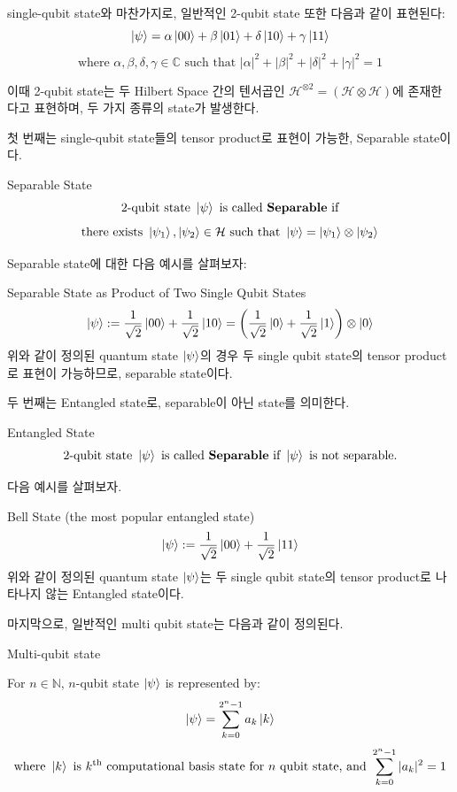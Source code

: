\noindent single-qubit state와 마찬가지로, 일반적인 2-qubit state 또한 다음과 같이 표현된다:
\[
    \ket{\psi} = \alpha \ket{00} + \beta \ket{01} + \delta \ket{10} + \gamma \ket{11}
\]
\[
    \text{where } \alpha, \beta, \delta, \gamma \in \mathbb{C} \text{ such that } |\alpha|^2 + |\beta|^2 + |\delta|^2 + |\gamma|^2 = 1
\]

\noindent 이때 2-qubit state는 두 Hilbert Space 간의 텐서곱인 \(\mathcal{H}^{\otimes 2} = (\mathcal{H} \otimes \mathcal{H})\)에 존재한다고 표현하며, 두 가지 종류의 state가 발생한다.

\noindent 첫 번째는 single-qubit state들의 tensor product로 표현이 가능한, Separable state이다.
\begin{definition}
    Separable State
    \[
        \text{2-qubit state }\ket{\psi} \text{ is called \textbf{Separable} if}
    \]
    \[
        \text{there exists } \ket{\psi_1}, \ket{\psi_2} \in \mathcal{H} \text{ such that } \ket{\psi} = \ket{\psi_1} \otimes \ket{\psi_2}
    \]

\end{definition}
Separable state에 대한 다음 예시를 살펴보자:
\begin{example}
    Separable State as Product of Two Single Qubit States
\[
    \ket \psi := {1 \over \sqrt{2}}\ket{00} + {1 \over \sqrt{2}}\ket{10} = \left({1 \over \sqrt{2}}\ket{0} + {1 \over \sqrt{2}}\ket{1}\right) \otimes \ket{0}
\]
위와 같이 정의된 quantum state \(\ket \psi\)의 경우 두 single qubit state의 tensor product로 표현이 가능하므로, separable state이다.
\end{example}

\noindent 두 번째는 Entangled state로, separable이 아닌 state를 의미한다.
\begin{definition}
    Entangled State
    \[
        \text{2-qubit state }\ket{\psi} \text{ is called \textbf{Separable} if } \ket\psi \text{ is not separable.}
    \]
\end{definition}

다음 예시를 살펴보자.
\begin{example}
    Bell State (the most popular entangled state)
\[
    \ket \psi := {1 \over \sqrt{2}}\ket{00} + {1 \over \sqrt{2}}\ket{11}
\]
위와 같이 정의된 quantum state \( \ket{\psi} \)는 두 single qubit state의 tensor product로 나타나지 않는 Entangled state이다.
\end{example}

\noindent 마지막으로, 일반적인 multi qubit state는 다음과 같이 정의된다.
\begin{definition}
Multi-qubit state

For \(n \in \mathbb{N}\), \(n\)-qubit state \(\ket{\psi}\) is represented by:
\[
    \ket{\psi} = \sum_{k = 0}^{2^n - 1} {a_k} \ket{k}
\]
\[
    \text{where } \ket{k} \text{ is }{k}^{\text{th}} \text{ computational basis state for } n \text{ qubit state, and } \sum^{2^n-1}_{k=0}{|a_k|^2} = 1
\]
\end{definition}

